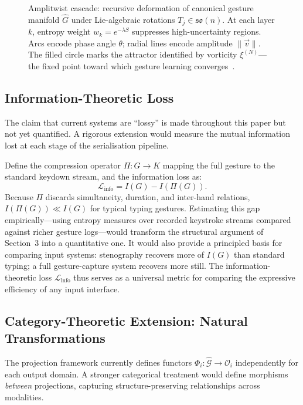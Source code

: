 \documentclass[11pt, a4paper]{article}
\begin{document}
\begin{figure}[H]
\caption{Amplitwist cascade: recursive deformation of canonical gesture
manifold $\hat{G}$ under Lie-algebraic rotations $T_j \in \mathfrak{so}(n)$.
At each layer $k$, entropy weight $w_k = e^{-\lambda S}$ suppresses
high-uncertainty regions. Arcs encode phase angle $\theta$; radial lines
encode amplitude $\|\vec{v}\|$. The filled circle marks the attractor
identified by vorticity $\xi^{(N)}$---the fixed point toward which
gesture learning converges~\cite{juarrero1999,needham1997}.}
\label{fig:cascade}
\end{figure}

\subsection{Information-Theoretic Loss}

The claim that current systems are ``lossy'' is made throughout this
paper but not yet quantified. A rigorous extension would measure the
mutual information lost at each stage of the serialisation pipeline.

Define the compression operator $\Pi : G \to K$ mapping the full gesture
to the standard keydown stream, and the information loss as:
\[
  \mathcal{L}_{\mathrm{info}} = I(G) - I(\Pi(G)).
\]
Because $\Pi$ discards simultaneity, duration, and inter-hand relations,
$I(\Pi(G)) \ll I(G)$ for typical typing gestures. Estimating this gap
empirically---using entropy measures over recorded keystroke streams
compared against richer gesture logs---would transform the structural
argument of Section~3 into a quantitative one. It would also provide a
principled basis for comparing input systems: stenography recovers more
of $I(G)$ than standard typing; a full gesture-capture system recovers
more still. The information-theoretic loss $\mathcal{L}_{\mathrm{info}}$
thus serves as a universal metric for comparing the expressive efficiency
of any input interface.

\subsection{Category-Theoretic Extension: Natural Transformations}

The projection framework currently defines functors
$\Phi_i : \hat{\mathcal{G}} \to \mathcal{O}_i$ independently for each
output domain. A stronger categorical treatment would define morphisms
\emph{between} projections, capturing structure-preserving relationships
across modalities.
\end{document}
